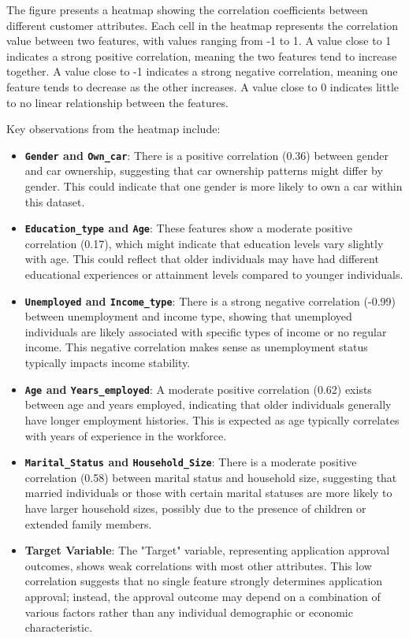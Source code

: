 \documentclass[12pt]{report}
\begin{document}
    The figure presents a heatmap showing the correlation coefficients between different customer attributes. Each cell in the heatmap represents the correlation value between two features, with values ranging from -1 to 1. A value close to 1 indicates a strong positive correlation, meaning the two features tend to increase together. A value close to -1 indicates a strong negative correlation, meaning one feature tends to decrease as the other increases. A value close to 0 indicates little to no linear relationship between the features.

    Key observations from the heatmap include:

    \begin{itemize}
        \item  {\bfseries \texttt{Gender} and \texttt{Own\_car}}: There is a positive correlation (0.36) between gender and car ownership, suggesting that car ownership patterns might differ by gender. This could indicate that one gender is more likely to own a car within this dataset.
        \item {\bfseries \texttt{Education\_type} and \texttt{Age}}: These features show a moderate positive correlation (0.17), which might indicate that education levels vary slightly with age. This could reflect that older individuals may have had different educational experiences or attainment levels compared to younger individuals.
        \item {\bfseries \texttt{Unemployed} and \texttt{Income\_type}}: There is a strong negative correlation (-0.99) between unemployment and income type, showing that unemployed individuals are likely associated with specific types of income or no regular income. This negative correlation makes sense as unemployment status typically impacts income stability.
        \item {\bfseries \texttt{Age} and \texttt{Years\_employed}}: A moderate positive correlation (0.62) exists between age and years employed, indicating that older individuals generally have longer employment histories. This is expected as age typically correlates with years of experience in the workforce.
        \item {\bfseries \texttt{Marital\_Status} and \texttt{Household\_Size}}: There is a moderate positive correlation (0.58) between marital status and household size, suggesting that married individuals or those with certain marital statuses are more likely to have larger household sizes, possibly due to the presence of children or extended family members.
        \item {\bfseries Target Variable}: The "Target" variable, representing application approval outcomes, shows weak correlations with most other attributes. This low correlation suggests that no single feature strongly determines application approval; instead, the approval outcome may depend on a combination of various factors rather than any individual demographic or economic characteristic.
    \end{itemize}
    
\end{document}
